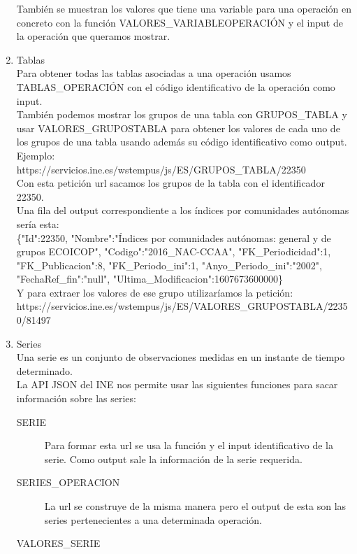 \begin{enumerate}
    También se muestran los valores que tiene una variable para una operación en concreto con la función VALORES\_VARIABLEOPERACIÓN y el input de la operación que queramos mostrar. 
    \item Tablas\\
    Para obtener todas las tablas asociadas a una operación usamos TABLAS\_OPERACIÓN con el código identificativo de la operación como input.\\
    También podemos mostrar los grupos de una tabla con GRUPOS\_TABLA y usar VALORES\_GRUPOSTABLA para obtener los valores de cada uno de los grupos de una tabla usando además su código identificativo como output. Ejemplo:\\
    https://servicios.ine.es/wstempus/js/ES/GRUPOS\_TABLA/22350\\
    Con esta petición url sacamos los grupos de la tabla con el identificador 22350.\\
    Una fila del output correspondiente a los índices por comunidades autónomas sería esta:\\
    \{"Id":22350, "Nombre":"Índices por comunidades autónomas: general y de grupos ECOICOP", "Codigo":"2016\_NAC-CCAA", "FK\_Periodicidad":1, "FK\_Publicacion":8, "FK\_Periodo\_ini":1, "Anyo\_Periodo\_ini":"2002", "FechaRef\_fin":"null", "Ultima\_Modificacion":1607673600000\}\\
    Y para extraer los valores de ese grupo utilizaríamos la petición:\\
    https://servicios.ine.es/wstempus/js/ES/VALORES\_GRUPOSTABLA/22350/81497\\
    \item Series\\
    Una serie es un conjunto de observaciones medidas en un instante de tiempo determinado.\\ 
    La API JSON del INE nos permite usar las siguientes funciones para sacar información sobre las series:  
    \begin{description}
            \item [SERIE]
            Para formar esta url se usa la función y el input identificativo de la serie. Como output sale la información de la serie requerida.\\
            \item [SERIES\_OPERACION]
            La url se construye de la misma manera pero el output de esta son las series pertenecientes a una determinada operación.\\
            \item [VALORES\_SERIE]

\end{description}
\end{enumerate}
